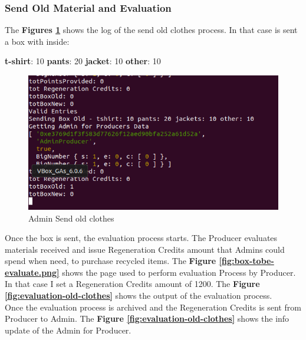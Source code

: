 \subsubsection{Send Old Material and Evaluation}

The \textbf{Figures \ref{fig:send-old-clothes}} shows the log of the send old clothes process.
In that case is sent a box with inside: 
\begin{outline}
    \1 \textbf{t-shirt}: 10
    \1 \textbf{pants}: 20
    \1 \textbf{jacket}: 10
    \1 \textbf{other}: 10
\end{outline}

\begin{figure}[h!]
	\centering
    \includegraphics[totalheight=6cm]{img/test/usecase2/0-send-old-clothes.png}
	\caption{Admin Send old clothes}
	\label{fig:send-old-clothes}
\end{figure}

Once the box is sent, the evaluation process starts. The Producer evaluates materials received
and issue Regeneration Credits amount that Admins could spend when need, to purchase
recycled items. The \textbf{Figure \ref{fig:box-tobe-evaluate.png}} shows the page used
to perform evaluation Process by Producer. In that case I set a Regeneration Credits amount
of 1200. The \textbf{Figure \ref{fig:evaluation-old-clothes}} shows the output of the evaluation process.
\\
Once the evaluation process is archived and the Regeneration Credits is sent
from Producer to Admin. The \textbf{Figure \ref{fig:evaluation-old-clothes}} shows the info update
of the Admin for Producer.

